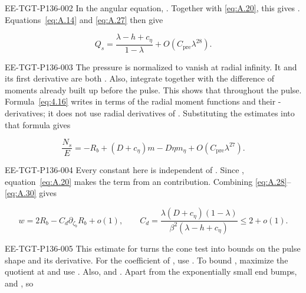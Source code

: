 \begin{EESegment}{EE-TGT-P136-002}
In the angular equation, . Together with \eqref{eq:A.20}, this gives
. Equations~\eqref{eq:A.14} and
\eqref{eq:A.27} then give
\end{EESegment}
\begin{equation}
 Q_s=\frac{\lambda-h+c_\eta}{1-\lambda}+O(C_{\mathrm{pre}}\lambda^{28}).
 \tag{A.29}\label{eq:A.29}
\end{equation}
\begin{EESegment}{EE-TGT-P136-003}
The pressure is normalized to vanish at radial infinity. It and its first
 derivative are both . Also, integrate
 together with the difference of moments already built up before the pulse. This
shows that
 throughout the pulse.
Formula~\eqref{eq:4.16} writes  in terms of the radial moment functions and their
-derivatives; it does not use radial derivatives of . Substituting
the estimates into that formula gives
\end{EESegment}
\begin{equation}
 \frac{N_s}{E}=-R_b+(D+c_\eta)m-D\eta m_\eta+O(C_{\mathrm{pre}}\lambda^{27}).
 \tag{A.30}\label{eq:A.30}
\end{equation}
\begin{EESegment}{EE-TGT-P136-004}
Every constant here is independent of . Since
, equation~\eqref{eq:A.20} makes the term from
 an  contribution. Combining
\eqref{eq:A.28}--\eqref{eq:A.30} gives
\end{EESegment}
\[
 w=2R_b-C_d\partial_{\zeta_b}R_b+o(1),
 \qquad C_d=\frac{\lambda(D+c_\eta)(1-\lambda)}{\beta^2(\lambda-h+c_\eta)}\leq2+o(1).
\]
\begin{EESegment}{EE-TGT-P136-005}
This estimate for  turns the cone test into bounds on the pulse shape and its derivative. For the
coefficient of , use
. To bound
, maximize the quotient at  and use
. Also,  and
. Apart from the exponentially small end bumps,
 and , so
\end{EESegment}
